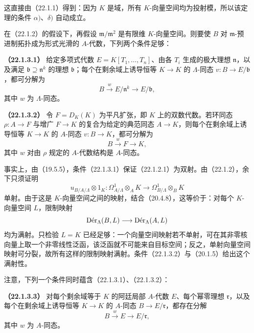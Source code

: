 这直接由（22.1.1）得到：因为 $K$ 是域，所有 $K$-向量空间均为投射模，所以该定理的条件 $\alpha)$、$\delta)$ 自动成立。

在（22.1.2）的假设下，再假设 $\mathfrak m/\mathfrak m^2$ 是有限维 $K$-向量空间。则要使 $B$ 对 $\mathfrak m$-预进制拓扑成为形式光滑的 $A$-代数，下列两个条件足够：

\noindent\textbf{（22.1.3.1）}\quad
给定多项式代数 $E=K[T_1,\ldots,T_n]$、由各 $T_i$ 生成的极大理想 $\mathfrak n$，以及满足 $\mathfrak b\supseteq\mathfrak n^k$ 的理想 $\mathfrak b$；每个在剩余域上诱导恒等 $K\to K$ 的 $\Lambda$-同态 $v:B\to E/\mathfrak b$，都可分解为
\[
 B\xrightarrow{w}E/\mathfrak n^k\longrightarrow E/\mathfrak b,
\]
其中 $w$ 为 $\Lambda$-同态。

\noindent\textbf{（22.1.3.2）}\quad
令 $F=D_K(K)$ 为平凡扩张，即 $K$ 上的双数代数。若环同态 $\rho:A\to F$ 与增广 $F\to K$ 的复合为给定的典范同态 $A\to K$，则每个在剩余域上诱导恒等 $K\to K$ 的 $A$-同态 $v:B\to K$，都可分解为
\[
 B\xrightarrow{w}F\longrightarrow K,
\]
其中 $w$ 对由 $\rho$ 规定的 $A$-代数结构是 $A$-同态。

事实上，由（19.5.5），条件（22.1.3.1）保证（22.1.2.1）为双射。由（22.1.2），余下只须证明
\[
 u_{B/A/\Lambda}\otimes1_K:
 \Omega^1_{A/\Lambda}\otimes_A K
 \longrightarrow\Omega^1_{B/\Lambda}\otimes_B K
\]
单射。由于这是 $K$-向量空间之间的映射，结合（20.4.8），这等价于：对每个 $K$-向量空间 $L$，限制映射
\[
 \Der_\Lambda(B,L)\longrightarrow\Der_\Lambda(A,L)
\]
均为满射。只检验 $L=K$ 已经足够：一个向量空间映射若不单射，可在其非零核向量上取一个非零线性泛函，该泛函就不可能来自目标空间；反之，单射向量空间映射可分裂，故所有这样的限制映射满射。条件（22.1.3.2）与（20.1.5）给出这个满射性。

注意，下列一个条件同时蕴含（22.1.3.1）、（22.1.3.2）：

\noindent\textbf{（22.1.3.3）}\quad
对每个剩余域等于 $K$ 的阿廷局部 $A$-代数 $E$、每个幂零理想 $\mathfrak r$，以及每个在剩余域上诱导恒等 $K\to K$ 的 $A$-同态 $B\to E/\mathfrak r$，都存在分解
\[
 B\xrightarrow{w}E\longrightarrow E/\mathfrak r,
\]
其中 $w$ 为 $A$-同态。


